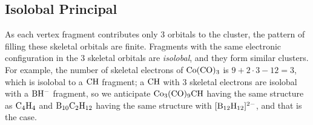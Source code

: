 \subsection{Isolobal Principal}
As each vertex fragment contributes only 3 orbitals to the cluster, the pattern of filling these skeletal orbitals are finite.
Fragments with the same electronic configuration in the 3 skeletal orbitals are \emph{isolobal}, and they form similar clusters.\\
For example, the number of skeletal electrons of $\rm Co(CO)_3$ is $9+2\cdot3-12=3$, which is isolobal to a $\rm CH$ fragment;
a $\rm CH$ with 3 skeletal electrons are isolobal with a $\rm BH^-$ fragment, so we anticipate 
$\rm Co_3(CO)_9CH$ having the same structure as $\rm C_4H_4$ and $\rm B_{10}C_2H_{12}$ having the same structure with $\rm [B_{12}H_{12}]^{2-}$, and that is the case.
	
	 
	
	
	
	
	
	
	
	